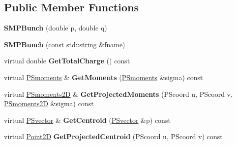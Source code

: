 \subsection*{Public Member Functions}
\begin{DoxyCompactItemize}
\item 
\mbox{\label{classSMPTracking_1_1SMPBunch_a61a520293b451d0f560cc2c4c16adc63}} 
{\bfseries S\+M\+P\+Bunch} (double p, double q)
\item 
\mbox{\label{classSMPTracking_1_1SMPBunch_a1fcd27d12e3f562557aa622d9891c5a9}} 
{\bfseries S\+M\+P\+Bunch} (const std\+::string \&fname)
\item 
\mbox{\label{classSMPTracking_1_1SMPBunch_a30caf121c33728c4fd2305cd5608a291}} 
virtual double {\bfseries Get\+Total\+Charge} () const
\item 
\mbox{\label{classSMPTracking_1_1SMPBunch_a0e0e4c827faf5c22dbdfe9fecd63afa7}} 
virtual \hyperlink{classTPSMoments}{P\+Smoments} \& {\bfseries Get\+Moments} (\hyperlink{classTPSMoments}{P\+Smoments} \&sigma) const
\item 
\mbox{\label{classSMPTracking_1_1SMPBunch_aedf1b5b50f7988c1418f54f6b2ee7c2e}} 
virtual \hyperlink{classTPSMoments_3_011_01_4}{P\+Smoments2D} \& {\bfseries Get\+Projected\+Moments} (P\+Scoord u, P\+Scoord v, \hyperlink{classTPSMoments_3_011_01_4}{P\+Smoments2D} \&sigma) const
\item 
\mbox{\label{classSMPTracking_1_1SMPBunch_ac695e06b67ecb0a09078ba211c56970a}} 
virtual \hyperlink{classPSvector}{P\+Svector} \& {\bfseries Get\+Centroid} (\hyperlink{classPSvector}{P\+Svector} \&p) const
\item 
\mbox{\label{classSMPTracking_1_1SMPBunch_a607959fe1d114f1aa235ccbb77fe8691}} 
virtual \hyperlink{classTVec2D}{Point2D} {\bfseries Get\+Projected\+Centroid} (P\+Scoord u, P\+Scoord v) const
\item 
\mbox{\label{classSMPTracking_1_1SMPBunch_aa311d476b5559c4dddeb465b5803857c}} 

\end{DoxyCompactItemize}
